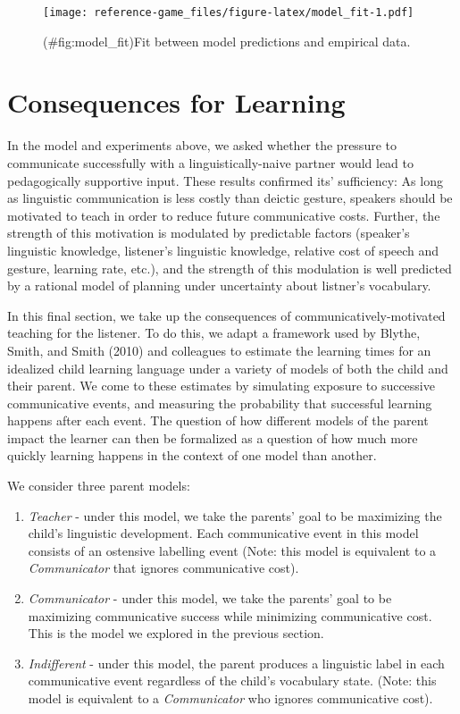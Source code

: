 \documentclass[english,,man,floatsintext]{apa6}
\begin{document}
\begin{figure}
\centering
\texttt{[image: reference-game\_files/figure-latex/model\_fit-1.pdf]}
\caption{(\#fig:model\_fit)Fit between model predictions and empirical data.}
\end{figure}

\hypertarget{consequences-for-learning}{%
\section{Consequences for Learning}\label{consequences-for-learning}}

In the model and experiments above, we asked whether the pressure to communicate successfully with a linguistically-naive partner would lead to pedagogically supportive input. These results confirmed its' sufficiency: As long as linguistic communication is less costly than deictic gesture, speakers should be motivated to teach in order to reduce future communicative costs. Further, the strength of this motivation is modulated by predictable factors (speaker's linguistic knowledge, listener's linguistic knowledge, relative cost of speech and gesture, learning rate, etc.), and the strength of this modulation is well predicted by a rational model of planning under uncertainty about listner's vocabulary.

In this final section, we take up the consequences of communicatively-motivated teaching for the listener. To do this, we adapt a framework used by Blythe, Smith, and Smith (2010) and colleagues to estimate the learning times for an idealized child learning language under a variety of models of both the child and their parent. We come to these estimates by simulating exposure to successive communicative events, and measuring the probability that successful learning happens after each event. The question of how different models of the parent impact the learner can then be formalized as a question of how much more quickly learning happens in the context of one model than another.

We consider three parent models:

\begin{enumerate}
\def\labelenumi{\arabic{enumi}.}
\item
  \emph{Teacher} - under this model, we take the parents' goal to be maximizing the child's linguistic development. Each communicative event in this model consists of an ostensive labelling event (Note: this model is equivalent to a \emph{Communicator} that ignores communicative cost).
\item
  \emph{Communicator} - under this model, we take the parents' goal to be maximizing communicative success while minimizing communicative cost. This is the model we explored in the previous section.
\item
  \emph{Indifferent} - under this model, the parent produces a linguistic label in each communicative event regardless of the child's vocabulary state. (Note: this model is equivalent to a \emph{Communicator} who ignores communicative cost).
\end{enumerate}
\end{document}
